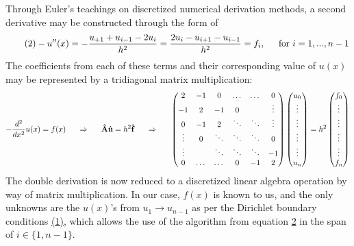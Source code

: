 \documentclass[11pt,a4paper,notitlepage]{article}
\begin{document}
Through Euler's teachings on discretized numerical derivation methods, a second derivative may be constructed through the form of
\begin{align}\label{eq:2}\tag{2}
-u''(x) = - \frac{u_{+1} + u_{i-1} - 2u_i}{h^2} = \frac{2u_i - u_{i+1} - u_{i-1}}{h^2} = f_i , \indent \text{for}\ i = 1,...,n-1
\end{align}
The coefficients from each of these terms and their corresponding value of $u(x)$ may be represented by a tridiagonal matrix multiplication:
\begin{align*}
-\frac{d^2}{dx^2}u(x) = f(x) \indent \Rightarrow \indent \mathbf{\hat{A}}\mathbf{\hat{u}} = h^2\mathbf{\hat{f}} \indent \Rightarrow \indent \left(\begin{matrix}
  2     & -1     & 0      & \dots  & \dots  & 0      \\
 -1     &  2     & -1     & 0      &        & \vdots \\
  0     & -1     &  2     & \ddots & \ddots & \vdots \\
 \vdots & 0      & \ddots & \ddots & \ddots & 0      \\
 \vdots &        & \ddots & \ddots & \ddots & -1     \\
  0     & \dots  & \dots  & 0      & -1     & 2      \\
\end{matrix}\right) \left(\begin{matrix}
u_0 \\
\vdots\\
\vdots\\
\vdots\\
\vdots\\
u_n \\
\end{matrix}\right) = h^2\left(\begin{matrix}
f_0 \\
\vdots\\
\vdots\\
\vdots\\
\vdots\\
f_n \\
\end{matrix}\right)
\end{align*}
The double derivation is now reduced to a discretized linear algebra  operation by way of matrix multiplication. In our case, $f(x)$ is known to us, and the only unknowns are the $u(x)$'s from $u_1 \rightarrow u_{n-1}$ as per the Dirichlet boundary conditions \hyperref[eq:1]{(1)}, which allows the use of the algorithm from equation \hyperref[eq:2]{2} in the span of $i \in \{1,n-1\}$.
\end{document}
